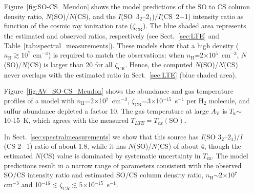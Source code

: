 \documentclass[]{aastex631}
\newcommand{\percc}{\ensuremath{\mathrm{cm}^{-3}}\xspace}
\begin{document}
Figure~\ref{fig:SO-CS_Meudon} shows the model predictions of the SO to CS column density ratio, \mbox{$N$(SO)/$N$(CS)}, and the \mbox{$I$(SO 3$_2$--2$_1$)/$I$(CS 2$-$1)} intensity ratio as function of the cosmic ray ionization rate ($\zeta_\mathrm{CR}$).
The blue shaded area represents the estimated and observed ratios, respectively (see Sect.~\ref{sec:LTE} and Table~\ref{tab:spectral_measurements}).
These models show that a high density ($n_\mathrm{H}\gtrsim10^7$ \percc) is required to match the observations: when $n_\mathrm{H}$=2$\times$10$^5$~\percc, \mbox{$N$(SO)/$N$(CS)} is larger than 20 for all $\zeta_\mathrm{CR}$.
Hence, the computed \mbox{$N$(SO)/$N$(CS)} never overlaps with the estimated ratio in Sect.~\ref{sec:LTE} (blue shaded area).

Figure~\ref{fig:AV_SO-CS_Meudon} shows the abundance and gas temperature profiles of a model with $n_\mathrm{H}$=2$\times$10$^{7}$~\percc, $\zeta_\mathrm{CR}$=3$\times$10$^{-15}$~s$^{-1}$ per H$_2$ molecule, and sulfur abundance depleted a factor 10.
The gas temperature at large $A_\mathrm{V}$ is $T_\mathrm{k}$$\sim$10-15~K, which agrees with the measured $T_{LTE}=T_{ex}(\mathrm{SO})$. 





In Sect.~\ref{sec:spectralmeasurements} we show that this source has $I$(SO 3$_2$--2$_1$)/$I$(CS 2$-$1) ratio of about 1.8, while it has $N$(SO)/$N$(CS) of about 4, though the estimated $N$(CS) value is dominated by systematic uncertainty in $T_\mathrm{ex}$. %
The model predictions result in a narrow range of parameters consistent with the observed SO/CS intensity ratio and estimated SO/CS column density ratio, $n_\mathrm{H}$$\sim$2$\times$10$^7$~\percc and 10$^{-16}$$\lesssim$$\zeta_{CR}$$\lesssim$5$\times$10$^{-15}$~s$^{-1}$.
\end{document}
